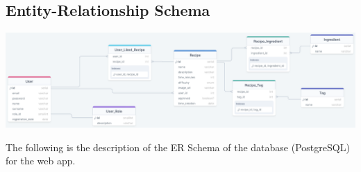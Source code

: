 \subsection{Entity-Relationship Schema}

\includegraphics[width=\textwidth]{images/er.png}

The following is the description of the ER Schema of the database (PostgreSQL) for the web app.\\

